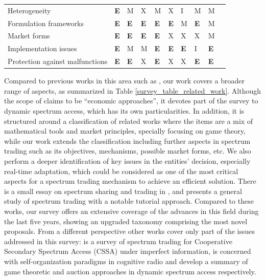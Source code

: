 \begin{landscape}
\begin{table}
\begin{tabular}{p{4.5cm}lllllllll|}
Heterogeneity														&	\textbf{E} 		& M 											& X 														& M 										 & X											 & I 									& M 										& M \\

Formulation frameworks									&	\textbf{E}	  & \textbf{E}							& \textbf{E} 									  & \textbf{E} 						 & \textbf{E}							 & M 									& \textbf{E} 						& M \\

Market forms														&	\textbf{E} 		& \textbf{E} 							& \textbf{E} 										& \textbf{E} 						 & X											 & X 									& X 										& M \\

Implementation issues										&	\textbf{E} 		& M 											& M 														& \textbf{E} 						 & \textbf{E}							 & \textbf{E} 				& I 										& \textbf{E} \\

Protection against malfunctions					&	\textbf{E} 		& \textbf{E} 							& X 														& \textbf{E} 						 & X											 & X 									& \textbf{E} 						& \textbf{E} \\
\hline				
\end{tabular}
\end{table}
\end{landscape}
Compared to previous works in this area such as \cite{ref:Maharjan2011,ref:Niyato2008_Spec,ref:Hossain2009,ref:Huang2013,ref:Zhang2013,ref:Akkara2011,ref:Zhang2012}, our work covers a broader range of aspects, as summarized in Table \ref{survey_table_related_work}.
Although the scope of \cite{ref:Maharjan2011} claims to be ``economic approaches'', it devotes part of the survey to dynamic spectrum access, which has its own particularities. 
In addition, it is structured around a classification of related works where the items are a mix of mathematical tools and market principles, specially focusing on game theory, while our work extends the classification including further aspects in spectrum trading such as its objectives, mechanisms, possible market forms, etc. 
We also perform a deeper identification of key issues in the entities' decision, especially real-time adaptation, which could be considered as one of the most critical aspects for a spectrum trading mechanism to achieve an efficient solution. 
There is a small essay on spectrum sharing and trading in \cite{ref:Niyato2008_Spec}, and \cite{ref:Hossain2009} presents a general study of spectrum trading with a notable tutorial approach. 
Compared to these works, our survey offers an extensive coverage of the advances in this field during the last five years, showing an upgraded taxonomy comprising the most novel proposals. 
From a different perspective other works cover only part of the issues addressed in this survey: \cite{ref:Huang2013} is a survey of spectrum trading for Cooperative Secondary Spectrum Access (CSSA) under imperfect information, \cite{ref:Zhang2013} is concerned with self-organization paradigms in cognitive radio and \cite{ref:Akkara2011,ref:Zhang2012} develop a summary of game theoretic and auction approaches in dynamic spectrum access respectively. 


